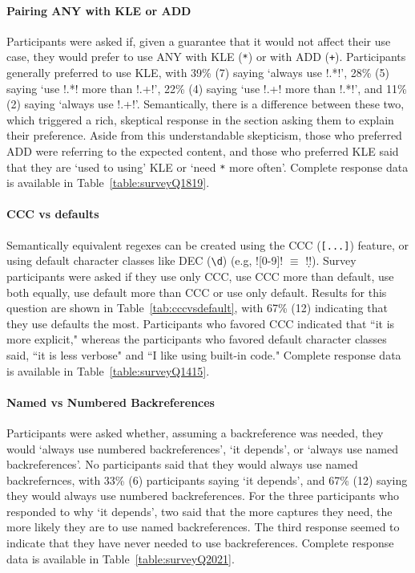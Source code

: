 \paragraph{Pairing ANY with KLE or ADD}  Participants were asked if, given a guarantee that it would not affect their use case, they would prefer to use ANY with KLE (\verb!*!) or with ADD (\verb!+!).  Participants generally preferred to use KLE, with 39\% (7) saying `always use \cverb!.*!', 28\% (5) saying `use \cverb!.*! more than \cverb!.+!', 22\% (4) saying `use \cverb!.+! more than \cverb!.*!', and 11\% (2) saying  `always use \cverb!.+!'.
Semantically, there is a difference between these two, which triggered a rich, skeptical response in the section asking them to explain their preference.  Aside from this understandable skepticism, those who preferred ADD were referring to the expected content, and those who preferred KLE said that they are `used to using' KLE or `need \verb!*! more often'.  Complete response data is available in Table~\ref{table:surveyQ1819}.

\paragraph{CCC vs defaults} Semantically equivalent regexes can be created using the CCC (\verb![...]!) feature, or using default character classes like DEC (\verb!\d!) (e.g, \cverb![0-9]! $\equiv$ \cverb!\d!).  Survey participants were asked if they use only CCC, use CCC more than default, use both equally, use default more than CCC or use only default.  Results for this question are shown in Table~\ref{tab:cccvsdefault}, with 67\% (12) indicating that they use defaults the most.
Participants who favored CCC indicated that ``it is more explicit," whereas the participants who favored default character classes said,  ``it is less verbose" and ``I like using built-in code."  Complete response data is available in Table~\ref{table:surveyQ1415}.

\paragraph{Named vs Numbered Backreferences}  Participants were asked whether, assuming a backreference was needed, they would `always use numbered backreferences', `it depends', or  `always use named backreferences'.  No participants said that they would always use named backrefernces, with 33\% (6) participants saying `it depends', and 67\% (12) saying they would always use numbered backreferences.  For the three participants who responded to why `it depends', two said that the more captures they need, the more likely they are to use named backreferences.  The third response seemed to indicate that they have never needed to use backreferences. Complete response data is available in Table~\ref{table:surveyQ2021}.

